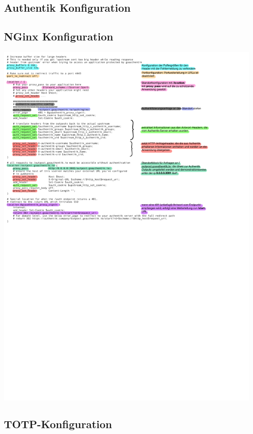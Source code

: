 \subsection{Authentik Konfiguration}
\label{app:AuthentikConfig}

\subsection{NGinx Konfiguration}
\label{app:CustomNGinxConfig}
\includegraphics{Anhang/Custom_NGinx_Configuration.pdf}

\subsection{TOTP-Konfiguration}
\label{sec:TOTPConfig}

